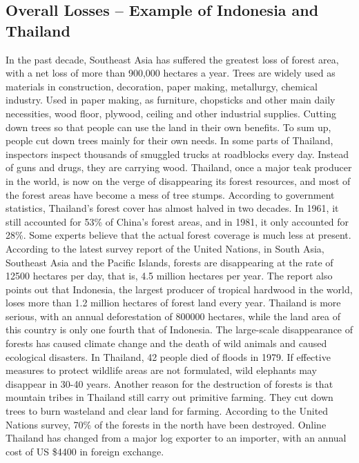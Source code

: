 \documentclass{book}\usepackage{knitr}
\begin{document}
\begin{knitrout}
\begin{kframe}
\section{Overall Losses – Example of Indonesia and Thailand}
In the past decade, Southeast Asia has suffered the greatest loss of forest area, with a net loss of more than 900,000 hectares a year. Trees are widely used as materials in construction, decoration, paper making, metallurgy, chemical industry. Used in paper making, as furniture, chopsticks and other main daily necessities, wood floor, plywood, ceiling and other industrial supplies. Cutting down trees so that people can use the land in their own benefits. To sum up, people cut down trees mainly for their own needs.
	In some parts of Thailand, inspectors inspect thousands of smuggled trucks at roadblocks every day. Instead of guns and drugs, they are carrying wood. Thailand, once a major teak producer in the world, is now on the verge of disappearing its forest resources, and most of the forest areas have become a mess of tree stumps. According to government statistics, Thailand's forest cover has almost halved in two decades. In 1961, it still accounted for 53\% of China's forest areas, and in 1981, it only accounted for 28\%. Some experts believe that the actual forest coverage is much less at present. According to the latest survey report of the United Nations, in South Asia, Southeast Asia and the Pacific Islands, forests are disappearing at the rate of 12500 hectares per day, that is, 4.5 million hectares per year. The report also points out that Indonesia, the largest producer of tropical hardwood in the world, loses more than 1.2 million hectares of forest land every year. Thailand is more serious, with an annual deforestation of 800000 hectares, while the land area of this country is only one fourth that of Indonesia. The large-scale disappearance of forests has caused climate change and the death of wild animals and caused ecological disasters. In Thailand, 42 people died of floods in 1979. If effective measures to protect wildlife areas are not formulated, wild elephants may disappear in 30-40 years. Another reason for the destruction of forests is that mountain tribes in Thailand still carry out primitive farming. They cut down trees to burn wasteland and clear land for farming. According to the United Nations survey, 70\% of the forests in the north have been destroyed. Online Thailand has changed from a major log exporter to an importer, with an annual cost of US \$4400 in foreign exchange.

\end{kframe}
\end{knitrout}
\end{document}
